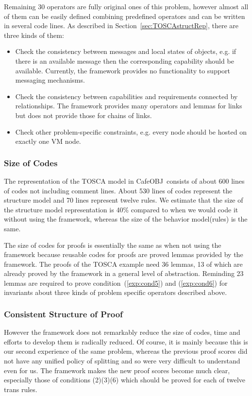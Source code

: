 \documentclass[12pt]{report}
\newcommand{\cafeobj}{{\sf CafeOBJ}~}
\begin{document}
Remaining 30 operators are fully original ones of this problem,
however almost all of them can be easily defined combining predefined
operators and can be written in several code lines. As described in
Section~\ref{sec:TOSCAstructRep}, there are three kinds of them:
\begin{itemize}
\item Check the consistency between messages and local states of
  objects, e.g. if there is an available message then the
  corresponding capability should be available. Currently, the
  framework provides no functionality to support messaging mechanisms.
\item Check the consistency between capabilities and requirements
  connected by relationships. The framework provides many operators
  and lemmas for links but does not provide those for chains of links.
\item Check other problem-specific constraints, e.g.  every node
  should be hosted on exactly one VM node.
\end{itemize}

\subsubsection{Size of Codes}
The representation of the TOSCA model in \cafeobj consists of about
600 lines of codes not including comment lines. About 530 lines of codes
represent the structure model and 70 lines represent twelve rules. We
estimate that the size of the structure model representation is 40\%
compared to when we would code it without using the framework, whereas
the size of the behavior model(rules) is the same.

The size of codes for proofs is essentially the same as when not using
the framework because reusable codes for proofs are proved lemmas
provided by the framework. The proofs of the TOSCA example need 36
lemmas, 13 of which are already proved by the framework in a general
level of abstraction. Reminding 23 lemmas are required to prove
condition~(\ref{exp:cond5}) and (\ref{exp:cond6}) for invariants about
three kinds of problem specific operators described above.

\subsubsection{Consistent Structure of Proof}
However the framework does not remarkably reduce the size of codes,
time and efforts to develop them is radically reduced. Of course, it
is mainly because this is our second experience of the same problem,
whereas the previous proof scores did not have any unified policy of
splitting and so were very difficult to understand even for us. The
framework makes the new proof scores become much clear, especially
those of conditions (2)(3)(6) which should be proved for each of
twelve trans rules.
\end{document}
